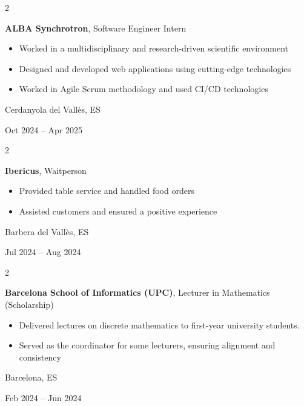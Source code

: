 \documentclass[10pt, letterpaper]{article}
\newenvironment{highlights}{
    \begin{itemize}[
        topsep=0.10 cm,
        parsep=0.10 cm,
        partopsep=0pt,
        itemsep=0pt,
        leftmargin=0.4 cm + 10pt
    ]
}{
    \end{itemize}
} %
\newenvironment{twocolentry}[2][]{
    \onecolentry
    \def\secondColumn{#2}
    \setcolumnwidth{\fill, 4.5 cm}
    \begin{paracol}{2}
}{
    \switchcolumn \raggedleft \secondColumn
    \end{paracol}
    \endonecolentry
} %
\begin{document}
        \begin{twocolentry}{
            Cerdanyola del Vallès, ES

            Oct 2024 – Apr 2025
        }
            \textbf{ALBA Synchrotron}, Software Engineer Intern
            \begin{highlights}
                \item Worked in a multidisciplinary and research-driven scientific environment
                \item Designed and developed web applications using cutting-edge technologies
                \item Worked in Agile Scrum methodology and used CI/CD technologies
            \end{highlights}
        \end{twocolentry}

        \vspace{0.2 cm}

        \begin{twocolentry}{
            Barbera del Vallès, ES

            Jul 2024 – Aug 2024
        }
            \textbf{Ibericus}, Waitperson
            \begin{highlights}
                \item Provided table service and handled food orders
                \item Assisted customers and ensured a positive experience
            \end{highlights}
        \end{twocolentry}

        \vspace{0.2 cm}

        \begin{twocolentry}{
            Barcelona, ES

            Feb 2024 – Jun 2024
        }
            \textbf{Barcelona School of Informatics (UPC)}, Lecturer in Mathematics (Scholarship)
            \begin{highlights}
                \item Delivered lectures on discrete mathematics to first-year university students.
                \item Served as the coordinator for some lecturers, ensuring alignment and consistency
            \end{highlights}
        \end{twocolentry}
\end{document}
